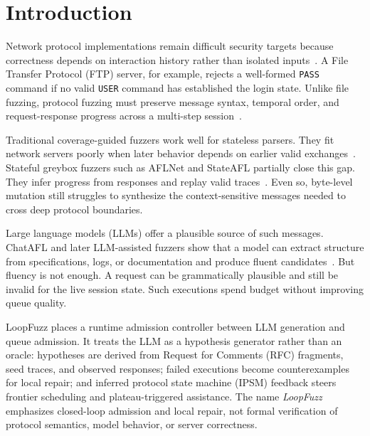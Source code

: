 \documentclass[final,5p,times,number]{elsarticle}
\begin{document}
\section{Introduction}
Network protocol implementations remain difficult security targets because correctness depends on interaction history rather than isolated inputs~\cite{aflnet,stateafl,sgf_usenix22,formatted_stateful_greybox_fuzzing_2024,resolverfuzz_query_response_2024}. A File Transfer Protocol (FTP) server, for example, rejects a well-formed \texttt{PASS} command if no valid \texttt{USER} command has established the login state. Unlike file fuzzing, protocol fuzzing must preserve message syntax, temporal order, and request-response progress across a multi-step session~\cite{resolverfuzz_query_response_2024,mbfuzzer_mqtt_2025,bleem_packet_sequence_2023,logos_log_guided_fuzzing_2024,diane_identifying_fuzzing_triggers_2021,corecrisis_context_aware_2025}.

Traditional coverage-guided fuzzers work well for stateless parsers. They fit network servers poorly when later behavior depends on earlier valid exchanges~\cite{directed_greybox_fuzzing_2017,seed_selection_successful_fuzzing_2021,one_fuzzing_strategy_rule_2022,regression_greybox_fuzzing_2021,efficient_errors_2022}. Stateful greybox fuzzers such as AFLNet and StateAFL partially close this gap. They infer progress from responses and replay valid traces~\cite{aflnet,stateafl,sgf_usenix22,profuzzbench_benchmark_stateful_protocol_2021,snapfuzz_high_throughput_fuzzing_2022,bleem_packet_sequence_2023,formatted_stateful_greybox_fuzzing_2024}. Even so, byte-level mutation still struggles to synthesize the context-sensitive messages needed to cross deep protocol boundaries.

Large language models (LLMs) offer a plausible source of such messages. ChatAFL and later LLM-assisted fuzzers show that a model can extract structure from specifications, logs, or documentation and produce fluent candidates~\cite{chatafl,fuzz4all_universal_fuzzing_large_2024,llmif_augmented_large_language_2024,matter_llm_specification_2024,carpetfuzz_documentation_2023,prompt_fuzzing_fuzz_driver_2024,large_language_models_are_2023,large_language_models_are_2024}. But fluency is not enough. A request can be grammatically plausible and still be invalid for the live session state. Such executions spend budget without improving queue quality.

LoopFuzz places a runtime admission controller between LLM generation and queue admission. It treats the LLM as a hypothesis generator rather than an oracle: hypotheses are derived from Request for Comments (RFC) fragments, seed traces, and observed responses; failed executions become counterexamples for local repair; and inferred protocol state machine (IPSM) feedback steers frontier scheduling and plateau-triggered assistance. The name \emph{LoopFuzz} emphasizes closed-loop admission and local repair, not formal verification of protocol semantics, model behavior, or server correctness.
\end{document}
